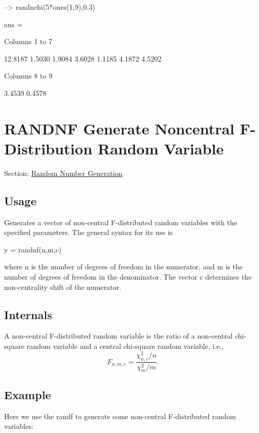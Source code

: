 \begin{DoxyVerbInclude}
--> randnchi(5*ones(1,9),0.3)

ans = 

 Columns 1 to 7

   12.8187    1.5030    1.9084    3.6028    1.1185    4.1872    4.5202 

 Columns 8 to 9

    3.4539    0.4578 
\end{DoxyVerbInclude}
 \hypertarget{random_randnf}{}\section{R\-A\-N\-D\-N\-F Generate Noncentral F-\/\-Distribution Random Variable}\label{random_randnf}
Section\-: \hyperlink{sec_random}{Random Number Generation} \hypertarget{vtkwidgets_vtkxyplotwidget_Usage}{}\subsection{Usage}\label{vtkwidgets_vtkxyplotwidget_Usage}
Generates a vector of non-\/central F-\/distributed random variables with the specified parameters. The general syntax for its use is \begin{DoxyVerb}   y = randnf(n,m,c)
\end{DoxyVerb}
 where {\ttfamily n} is the number of degrees of freedom in the numerator, and {\ttfamily m} is the number of degrees of freedom in the denominator. The vector {\ttfamily c} determines the non-\/centrality shift of the numerator. \hypertarget{transforms_svd_Function}{}\subsection{Internals}\label{transforms_svd_Function}
A non-\/central F-\/distributed random variable is the ratio of a non-\/central chi-\/square random variable and a central chi-\/square random variable, i.\-e., \[ F_{n,m,c} = \frac{\chi_{n,c}^2/n}{\chi_m^2/m}. \] \hypertarget{variables_struct_Example}{}\subsection{Example}\label{variables_struct_Example}
Here we use the {\ttfamily randf} to generate some non-\/central F-\/distributed random variables\-:


